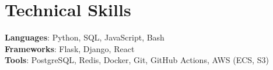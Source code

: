\documentclass[letterpaper,11pt]{article}
\begin{document}
\section{Technical Skills}
 \begin{itemize}[leftmargin=0.15in, label={}]
    \small{\item{
     \textbf{Languages}{: Python, SQL, JavaScript, Bash} \\
     \textbf{Frameworks}{: Flask, Django, React} \\
     \textbf{Tools}{: PostgreSQL, Redis, Docker, Git, GitHub Actions, AWS (ECS, S3)}
    }}
 \end{itemize}
\end{document}
